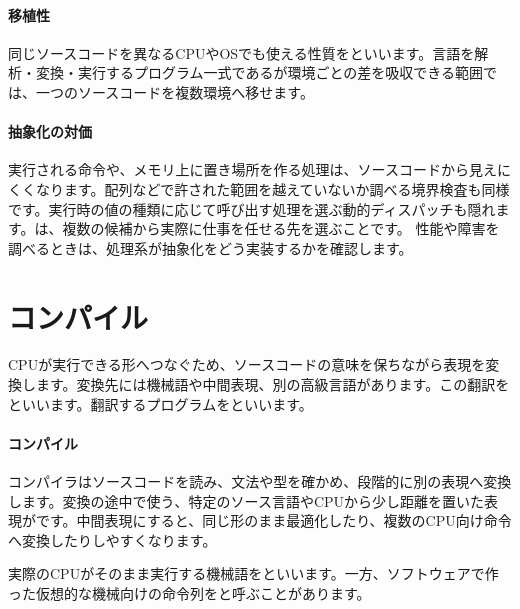\par
\endgroup
\medskip
\begingroup
\paragraph{移植性}
        同じソースコードを異なるCPUやOSでも使える性質をといいます。言語を解析・変換・実行するプログラム一式であるが環境ごとの差を吸収できる範囲では、一つのソースコードを複数環境へ移せます。

\par
\endgroup
  \vspace{4mm}
\paragraph{抽象化の対価}
    実行される命令や、メモリ上に置き場所を作る処理は、ソースコードから見えにくくなります。配列などで許された範囲を越えていないか調べる境界検査も同様です。実行時の値の種類に応じて呼び出す処理を選ぶ動的ディスパッチも隠れます。は、複数の候補から実際に仕事を任せる先を選ぶことです。
    性能や障害を調べるときは、処理系が抽象化をどう実装するかを確認します。

\par
\endgroup


\section{コンパイル}
\label{sec:02-language-04}

CPUが実行できる形へつなぐため、ソースコードの意味を保ちながら表現を変換します。変換先には機械語や中間表現、別の高級言語があります。この翻訳をといいます。翻訳するプログラムをといいます。

\begingroup
  \centering
  \vspace{5mm}
\begingroup
\paragraph{コンパイル}
        コンパイラはソースコードを読み、文法や型を確かめ、段階的に別の表現へ変換します。変換の途中で使う、特定のソース言語やCPUから少し距離を置いた表現がです。中間表現にすると、同じ形のまま最適化したり、複数のCPU向け命令へ変換したりしやすくなります。

        実際のCPUがそのまま実行する機械語をといいます。一方、ソフトウェアで作った仮想的な機械向けの命令列をと呼ぶことがあります。

